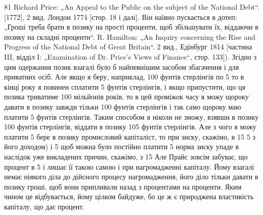 81    Richard Price: „An Appeal to the Public on the subject of the National Debt“.
[1772], 2 вид. Лондон 1774 [стор. 18 і далі]. Він наївно пускається в дотеп: „Гроші
треба брати в позику на прості проценти, щоб збільшувати їх, віддаючи в позику
на складні проценти“. R. Hamilton: „An Inquiry concerning the Rise and
Progress of the National Debt of Great Britain“. 2 вид., Едінбург 1814 [частина III,
відділ I: „Examination of Dr. Price’s Views of Finance“, стор. 133]). Згідно з цим
одержання позик взагалі було б найпевнішим засобом збагачення і для приватних
осіб. Але якщо я беру, наприклад, 100 фунтів стерлінгів по 5%
то в кінці року я повинен сплатити 5 фунтів стерлінгів, і якщо припустити, що
ця позика триватиме 100 мільйонів років, то в цей проміжок часу я можу щороку
давати в позику завжди тільки 100 фунтів стерлінгів і так само щороку маю платити
5 фунтів стерлінгів. Таким способом я ніколи не зможу, взявши в позику
100 фунтів стерлінгів, віддати в позику 105 фунтів стерлінгів. Але з чого я можу
платити 5%
бере в позику промисловий капіталіст, то при зиску, скажімо, в 15%
5%
з його доходом) і 5%
щоб можна було постійно платити 5%
норма зиску упаде в наслідок уже викладених причин, скажімо, з 15%
Але Прайс зовсім забуває, що процент в 5%
і лишає її такою самою і при нагромадженні капіталу. Йому взагалі немає ніякого
діла до дійсного процесу нагромадження, його діло тільки давати в позику
гроші, щоб вони припливали назад з процентами на проценти. Яким чином
це відбувається, йому цілком байдуже, бо це ж є природжена властивість
капіталу, що дає процент.
